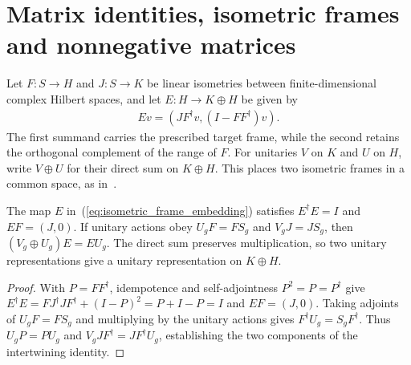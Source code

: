 \section{Matrix identities, isometric frames and nonnegative matrices}

\begin{definition}
    \label{def:isometric_frame_embedding}
    \leanok
    Let $F:S\to H$ and $J:S\to K$ be linear isometries between finite-dimensional
    complex Hilbert spaces, and let $E:H\to K\oplus H$ be given by
    \begin{align}
        \label{eq:isometric_frame_embedding}
        Ev=(JF^\dagger v,(I-FF^\dagger)v).
    \end{align}
    The first summand carries the prescribed target frame, while the second
    retains the orthogonal complement of the range of $F$. For unitaries $V$ on
    $K$ and $U$ on $H$, write $V\oplus U$ for their direct sum on $K\oplus H$.
    This places two isometric frames in a common space, as
    in~\cite[Section~II.F.2]{Schuch2011Phases}.
\end{definition}

\begin{lemma}
    \label{thm:isometric_frame_embedding}
    \leanok
    The map $E$ in~(\ref{eq:isometric_frame_embedding}) satisfies $E^\dagger E=I$
    and $EF=(J,0)$. If unitary actions obey $U_gF=FS_g$ and $V_gJ=JS_g$,
    then $(V_g\oplus U_g)E=EU_g$. The direct sum preserves multiplication,
    so two unitary representations give a unitary representation on $K\oplus H$.
\end{lemma}

\begin{proof}\leanok
    With $P=FF^\dagger$, idempotence and self-adjointness $P^2=P=P^\dagger$
    give $E^\dagger E=FJ^\dagger JF^\dagger+(I-P)^2=P+I-P=I$ and $EF=(J,0)$.
    Taking adjoints of $U_gF=FS_g$ and multiplying by the unitary actions
    gives $F^\dagger U_g=S_gF^\dagger$. Thus $U_gP=PU_g$ and
    $V_gJF^\dagger=JF^\dagger U_g$, establishing the two components of the
    intertwining identity.
\end{proof}

